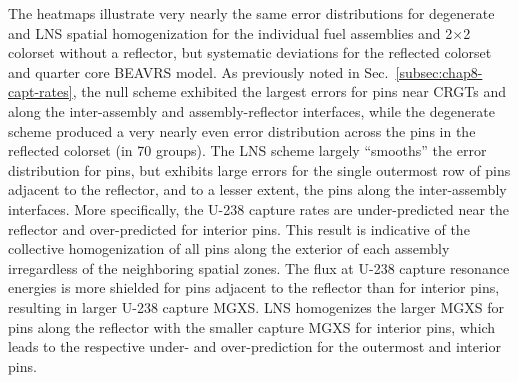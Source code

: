The heatmaps illustrate very nearly the same error distributions for degenerate and \ac{LNS} spatial homogenization for the individual fuel assemblies and 2$\times$2 colorset without a reflector, but systematic deviations for the reflected colorset and quarter core \ac{BEAVRS} model. As previously noted in Sec.~\ref{subsec:chap8-capt-rates}, the null scheme exhibited the largest errors for pins near \acp{CRGT} and along the inter-assembly and assembly-reflector interfaces, while the degenerate scheme produced a very nearly even error distribution across the pins in the reflected colorset (in 70 groups). The \ac{LNS} scheme largely ``smooths'' the error distribution for pins, but exhibits large errors for the single outermost row of pins adjacent to the reflector, and to a lesser extent, the pins along the inter-assembly interfaces. More specifically, the U-238 capture rates are under-predicted near the reflector and over-predicted for interior pins. This result is indicative of the collective homogenization of all pins along the exterior of each assembly irregardless of the neighboring spatial zones. The flux at U-238 capture resonance energies is more shielded for pins adjacent to the reflector than for interior pins, resulting in larger U-238 capture \ac{MGXS}. \ac{LNS} homogenizes the larger \ac{MGXS} for pins along the reflector with the smaller capture \ac{MGXS} for interior pins, which leads to the respective under- and over-prediction for the outermost and interior pins. 

